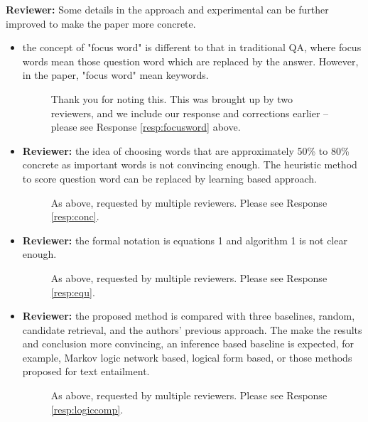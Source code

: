 \documentclass[10pt]{article}
\begin{document}
\textbf{Reviewer:} Some details in the approach and experimental can be further improved to
make the paper more concrete.
\begin{itemize}
\item the concept of "focus word" is different to that in traditional QA, where
focus words mean those question word which are replaced by the answer.
However, in the paper, "focus word" mean keywords.

\begin{figure}[H]
\caption{ Thank you for noting this.  This was brought up by two reviewers, and we include our response and corrections earlier -- please see Response \ref{resp:focusword} above.}
\end{figure}

\item \textbf{Reviewer:} the idea of choosing words that are approximately 50\% to 80\% concrete as important words is not convincing enough. The heuristic method to score
question word can be replaced by learning based approach.

\begin{figure}[H]
\caption{ As above, requested by multiple reviewers.  Please see Response \ref{resp:conc}. }
\end{figure}

\item \textbf{Reviewer:} the formal notation is equations 1 and algorithm 1 is not clear enough.

\begin{figure}[H]
\caption{ As above, requested by multiple reviewers.  Please see Response \ref{resp:equ}. }
\end{figure}

\item \textbf{Reviewer:} the proposed method is compared with three baselines, random, candidate
retrieval, and the authors' previous approach. The make the results and
conclusion more convincing, an inference based baseline is expected, for
example, Markov logic network based, logical form based, or those methods
proposed for text entailment.

\begin{figure}[H]
\caption{ As above, requested by multiple reviewers.  Please see Response \ref{resp:logiccomp}. }
\end{figure}

\end{itemize}
\end{document}
